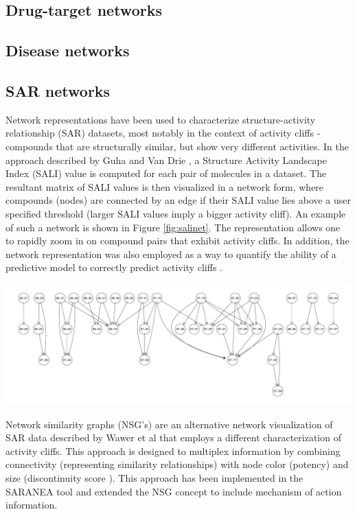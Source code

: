 \documentclass[12pt,letterpaper]{article}
\begin{document}
\subsection{Drug-target networks}
\label{sec:drug-target-networks}


\subsection{Disease networks}
\label{sec:disease-networks}

\subsection{SAR networks}
\label{sec:sar-networks}

Network representations have been used to characterize
structure-activity relationship (SAR) datasets, most notably in the
context of activity cliffs \cite{Maggiora:2006aa} - compounds that are
structurally similar, but show very different activities. In the approach
described by Guha and Van Drie \cite{Guha:2008aa}, a Structure
Activity Landscape Index (SALI) value is computed for each pair of
molecules in a dataset. The resultant matrix of SALI values is then
visualized in a network form, where compounds (nodes) are connected by
an edge if their SALI value lies above a user specified threshold
(larger SALI values imply a bigger activity cliff). An example of such
a network is shown in Figure \ref{fig:salinet}. The representation
allows one to rapidly zoom in on compound pairs that exhibit activity
cliffs. In addition, the network representation was also employed as a
way to quantify the ability of a predictive model to correctly predict
activity cliffs \cite{Guha:2008ab}.

{}
{\includegraphics[width=\linewidth]{img/salinet}}

Network similarity graphs (NSG's) are an alternative network
visualization of SAR data described by Wawer et al \cite{Wawer:2008aa}
that employs a different characterization of activity cliffs. This
approach is designed to multiplex information by combining
connectivity (representing similarity relationships) with node color
(potency) and size (discontinuity score \cite{Peltason:2007aa}). This
approach has been implemented in the SARANEA tool
\cite{Lounkine:2010fk} and extended \cite{Iyer:2011ij} the NSG concept
to include mechanism of action information.
\end{document}

